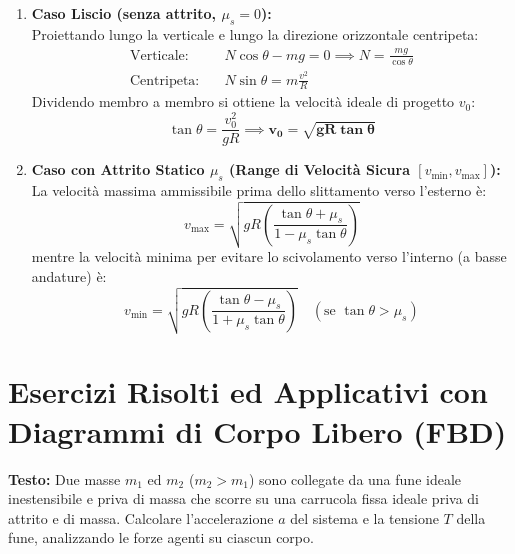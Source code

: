 \begin{enumerate}
    \item \textbf{Caso Liscio (senza attrito, $\mu_s = 0$):}\\
    Proiettando lungo la verticale e lungo la direzione orizzontale centripeta:
    \begin{align}
        \text{Verticale:} \quad & N\cos\theta - mg = 0 \implies N = \frac{mg}{\cos\theta} \\
        \text{Centripeta:} \quad & N\sin\theta = m\frac{v^2}{R}
    \end{align}
    Dividendo membro a membro si ottiene la velocità ideale di progetto $v_0$:
    \begin{equation}
        \tan\theta = \frac{v_0^2}{g R} \implies \mathbf{v_0 = \sqrt{g R \tan\theta}}
        \label{eq:curva_ideale}
    \end{equation}
    
    \item \textbf{Caso con Attrito Statico $\mu_s$ (Range di Velocità Sicura $[v_{\min}, v_{\max}]$):}\\
    La velocità massima ammissibile prima dello slittamento verso l'esterno è:
    \begin{equation}
        v_{\max} = \sqrt{g R \left(\frac{\tan\theta + \mu_s}{1 - \mu_s\tan\theta}\right)}
    \end{equation}
    mentre la velocità minima per evitare lo scivolamento verso l'interno (a basse andature) è:
    \begin{equation}
        v_{\min} = \sqrt{g R \left(\frac{\tan\theta - \mu_s}{1 + \mu_s\tan\theta}\right)} \quad (\text{se } \tan\theta > \mu_s)
    \end{equation}
\end{enumerate}

\section{Esercizi Risolti ed Applicativi con Diagrammi di Corpo Libero (FBD)}
\label{sec:esercizi_dinamica}

\begin{esercizio}
\textbf{Testo:}
Due masse $m_1$ ed $m_2$ ($m_2 > m_1$) sono collegate da una fune ideale inestensibile e priva di massa che scorre su una carrucola fissa ideale priva di attrito e di massa. Calcolare l'accelerazione $a$ del sistema e la tensione $T$ della fune, analizzando le forze agenti su ciascun corpo.
\end{esercizio}

